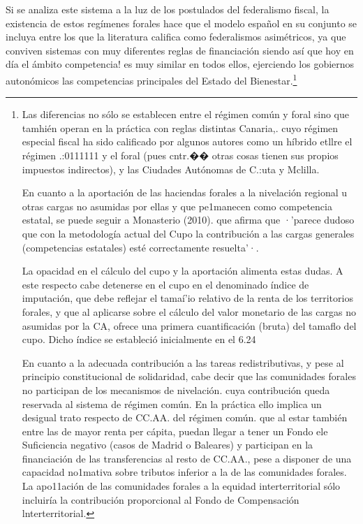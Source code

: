 \documentclass[10pt,a4paper]{article}
\begin{document}
Si se analiza este sistema a la luz de los postulados del federalismo fiscal, la existencia de estos regímenes forales hace que el modelo español en su conjunto se incluya entre los que la literatura califica como federalismos asimétricos, ya que conviven sistemas con muy diferentes reglas de financiación siendo así que hoy en día el ámbito competencia! es muy similar en todos ellos, ejerciendo los gobiernos autonómicos las competencias principales del Estado del Bienestar.\footnote{Las diferencias no sólo se establecen entre el régimen común y foral sino que tamhién operan en la práctica con reglas distintas Canaria,. cuyo régimen especial fiscal ha sido calificado por algunos autores como un híbrido etllre el régimen .:0111{111 y el foral (pues cntr.�� otras cosas tienen sus propios impuestos indirectos), y las Ciudades Autónomas de C.:uta y Mclilla.
}

En cuanto a la aportación de las haciendas forales a la nivelación regional u otras cargas no asumidas por ellas y que pe1manecen como competencia estatal, se puede seguir a Monasterio (2010). que afirma que ·'parece dudoso que con la metodología actual del Cupo la contribución a las cargas generales (competencias estatales) esté correctamente resuelta'·.

La opacidad en el cálculo del cupo y la aportación alimenta estas dudas. A este respecto cabe detenerse en el cupo en el denominado índice de imputación, que debe reflejar el tamaí'io relativo de la renta de los territorios forales, y que al aplicarse sobre el cálculo del valor monetario de las cargas no asumidas por la CA, ofrece una primera cuantificación (bruta) del tamaflo del cupo. Dicho índice se estableció inicialmente en el 6.24%

En cuanto a la adecuada contribución a las tareas redistributivas, y pese al principio constitucional de solidaridad, cabe decir que las comunidades forales no participan de los mecanismos de nivelación. cuya contribución queda reservada al sistema de régimen común. En la práctica ello implica un desigual trato respecto de CC.AA. del régimen común. que al estar también entre las de mayor renta per cápita, puedan llegar a tener un Fondo ele Suficiencia negativo (casos de Madrid o Baleares) y participan en la financiación de las transferencias al resto de CC.AA., pese a disponer de una capacidad no1mativa sobre tributos inferior a la de las comunidades forales. La apo11ación de las comunidades forales a la equidad interterritorial sólo incluiría la contribución proporcional al Fondo de Compensación lnterterritorial.

}
\end{document}
